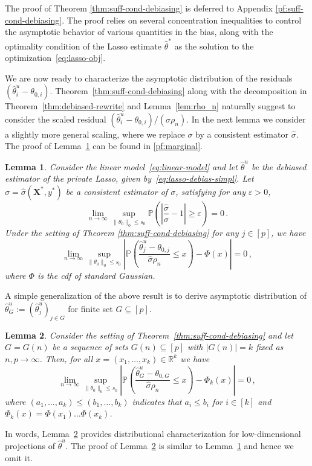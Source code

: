 \documentclass[11pt]{article}
\newtheorem{lemma}{Lemma}%
\newcommand{\bX}{\boldsymbol{X}}
\newcommand{\Prob}{\mathbb{P}}
\newcommand{\hth}{\widehat{\theta}}
\begin{document}
The proof of Theorem \ref{thm:suff-cond-debiasing} is deferred to Appendix \ref{pf:suff-cond-debiasing}. The proof relies on several concentration inequalities to control the asymptotic behavior of various quantities in the bias, along with the optimality condition of the Lasso estimate $\hth^*$ as the solution to the optimization~\eqref{eq:lasso-obj}. 

We are now ready to characterize the asymptotic distribution of the residuals $(\hth^u_i-\theta_{0,i})$. Theorem~\ref{thm:suff-cond-debiasing} along with the decomposition in Theorem~\ref{thm:debiased-rewrite} and Lemma~\ref{lem:rho_n} naturally suggest to consider the scaled residual $(\hth^u_i-\theta_{0,i})/(\sigma \rho_n)$. In the next  lemma we consider a slightly more general scaling, where we replace $\sigma$ by a consistent estimator $\widehat{\sigma}$. The proof of Lemma~\ref{lem:marginal} can be found in \ref{pf:marginal}.
\begin{lemma}\label{lem:marginal}
    Consider the linear model~\eqref{eq:linear-model} and let $\hth^u$ be the debiased estimator of the private Lasso, given by~\eqref{eq:lasso-debias-simpl}. Let $\widehat{\sigma} = \widehat{\sigma}(\bX^*,y^*)$ be a consistent estimator of $\sigma$,  satisfying for any $\varepsilon>0$,
    \[
    \lim_{n\to\infty} \sup_{\|\theta_0\|_{0}\le s_0} \mathbb{P}\left(\left|\frac{\widehat{\sigma}}{\sigma} - 1 \right|\ge \varepsilon\right) = 0\,.
    \]
    Under the setting of Theorem \ref{thm:suff-cond-debiasing} for any $j\in [p]$, we have 
    \[
    \lim_{n\to\infty}\sup_{\|\theta_0\|_{0}\le s_0}\left|\Prob\left(\frac{\hth^u_j-\theta_{0,j}}{\widehat{\sigma}\rho_n}\leq x\right)-\Phi(x)\right|=0\,,
    \]
    where $\Phi$ is the cdf of standard Gaussian.
\end{lemma}

A simple generalization of the above result is to derive asymptotic distribution of $\hth^u_G:= (\hth^u_j)_{j\in G}$ for finite set $G\subseteq[p]$.
\begin{lemma}\label{lem:marginal-gen}
 Consider the setting of Theorem~\ref{thm:suff-cond-debiasing} and let $G=G(n)$ be a sequence of sets $G(n)\subseteq[p]$ with $|G(n)| = k$ fixed as $n,p\to\infty$.  Then, for all $x = (x_1,\dotsc, x_k)\in\mathbb{R}^k$ we have
\[
\lim_{n\to\infty}\sup_{\|\theta_0\|_{0}\le s_0}\left|\Prob\left(\frac{\hth^u_G-\theta_{0,G}}{\widehat{\sigma}\rho_n}\leq x\right)-\Phi_k(x)\right|=0\,,
\]
where $(a_1,\dotsc, a_k)\le (b_1,\dotsc, b_k)$ indicates that $a_i\le b_i$ for $i\in[k]$ and $\Phi_k(x) = \Phi(x_1)\dotsc \Phi(x_k)$.
\end{lemma}
In words, Lemma~\ref{lem:marginal-gen} provides distributional characterization for low-dimensional projections of $\hth^u$. The proof of Lemma~\ref{lem:marginal-gen} is similar to Lemma~\ref{lem:marginal} and hence we omit it.
\end{document}
